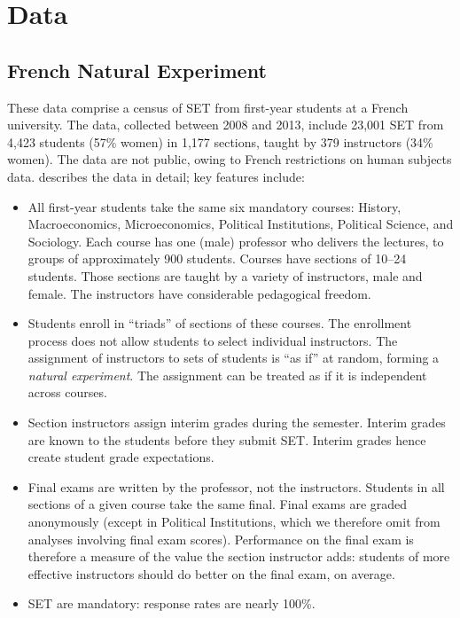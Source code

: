\documentclass[12pt]{article}
\begin{document}
\section{Data}
\subsection{French Natural Experiment}
These data comprise a census of SET from first-year students at a French university.
The data, collected between 2008 and 2013, include 23,001 SET from
4,423 students (57\% women) in 1,177
sections, taught by 379 instructors (34\% women). 
The data are not public, owing to French restrictions on human subjects data.
\citet{Boring2015} describes the data in detail; key features include:
\begin{itemize}
   \item All first-year students take the same six mandatory courses: 
            History, Macroeconomics, Microeconomics, 
            Political Institutions, Political Science, and Sociology.
            Each course has one (male) professor
            who delivers the lectures, to groups of approximately 900 students. 
            Courses have sections of 10--24 students. 
            Those sections are taught by a variety of instructors, male and female.
            The instructors have considerable pedagogical freedom.
    
   \item Students enroll in ``triads'' of sections of these courses. 
            The enrollment process
            does not allow students to select individual instructors.
            The assignment of instructors to sets of students is ``as if'' at random,
            forming a \emph{natural experiment}.
            The assignment can be treated as if it is independent across 
            courses.
            
   \item Section instructors assign interim grades during the semester.
            Interim grades are known to the students before they submit SET.
            Interim grades hence create student grade expectations.
            
   \item Final exams are written by the professor, not the instructors.
            Students in all sections of a given course take the same final.
            Final exams are graded anonymously (except in Political
            Institutions, which we therefore omit from analyses involving final exam scores).
            Performance on the final exam is therefore a measure of the value the
            section instructor adds: students of more effective instructors should do better on
            the final exam, on average.
    
   \item SET are mandatory: response rates are nearly 100\%.
   
\end{itemize}
\end{document}
